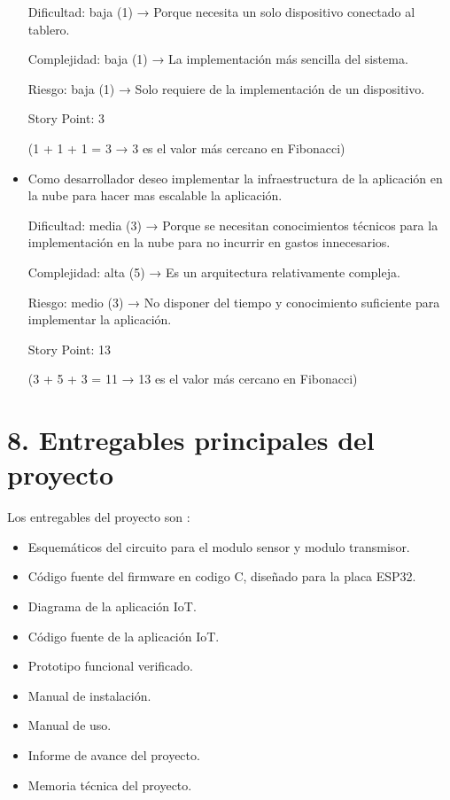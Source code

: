 \documentclass[
11pt, %
]{charter}
\begin{document}
\begin{itemize}
Dificultad: baja (1) → Porque necesita un solo dispositivo conectado al tablero.

Complejidad: baja (1) → La implementación más sencilla del sistema.

Riesgo: baja (1) → Solo requiere de la implementación de un dispositivo.

Story Point: 3 

(1 + 1 + 1 = 3 → 3 es el valor más cercano en Fibonacci)

\item{Como desarrollador deseo implementar la infraestructura de la aplicación en la nube para hacer mas escalable la aplicación.}


Dificultad: media (3) → Porque se necesitan conocimientos técnicos para la implementación en la nube para no incurrir en gastos innecesarios.

Complejidad: alta (5) → Es un arquitectura relativamente compleja.

Riesgo: medio (3) → No disponer del tiempo y conocimiento suficiente para implementar la aplicación.

Story Point: 13 

(3 + 5 + 3 = 11 → 13 es el valor más cercano en Fibonacci)


\end{itemize}



\section{8. Entregables principales del proyecto}
\label{sec:entregables}


Los entregables del proyecto son :

\begin{itemize}
	
	\item Esquemáticos del circuito para el modulo sensor y modulo transmisor.
	\item Código fuente del firmware en codigo C, diseñado para la placa ESP32.
	\item Diagrama de la aplicación	IoT.
	\item Código fuente de la aplicación IoT.
	\item Prototipo funcional verificado.	
	\item Manual de instalación.
	\item Manual de uso.
	\item Informe de avance del proyecto.
	\item Memoria técnica del proyecto.
\end{itemize}
\end{document}
